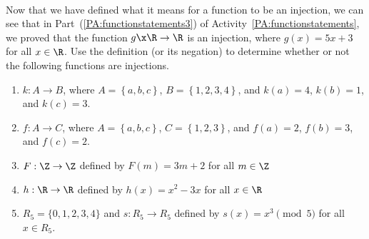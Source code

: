 \begin{center}
\end{center}
%
\begin{prog} \label{pr:injections} \hfill \\
Now that we have defined what it means for a function to be an injection, we can see that in 
Part~(\ref{PA:functionstatements3}) of \typeu Activity~\ref*{PA:functionstatements}, we proved that the function $g\x \R \to \R$ is an injection, where $g ( x ) = 5x + 3$ for all $x \in \R$.  Use the definition (or its negation) to determine whether or not the following functions are injections.
\begin{enumerate}
\item $k:A \to B$, where $A = \left\{a, b, c \right\}$, $B = \left\{1, 2, 3, 4 \right\}$, and 
$k (a) = 4$, $k(b) = 1$, and $k(c) = 3$.

\item $f:A \to C$, where $A = \left\{a, b, c \right\}$, $C = \left\{1, 2, 3\right\}$, and 
$f(a) = 2$, $f(b) = 3$, and $f(c) = 2$.

\item $F: \Z \to \Z$ defined by $F ( m ) = 3m + 2$ for all $m \in \Z$

\item $h: \R \to \R$ defined by $h ( x ) = x^2 - 3x$ for all $x \in \R$

\item $R_5 = \{0, 1, 2, 3, 4 \}$ and $s:R_5 \to R_5$ defined by $s ( x ) = x^3 \pmod 5$ for all $x \in R_5$.

\end{enumerate}
\end{prog}
\hbreak

\endinput
